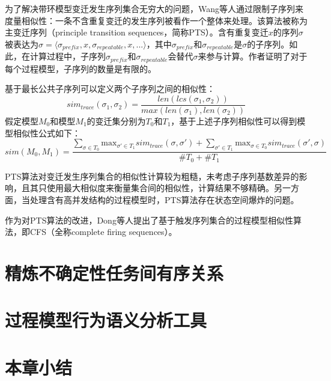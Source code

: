 为了解决带环模型变迁发生序列集合无穷大的问题，Wang等人通过限制子序列来度量相似性：一条不含重复变迁的发生序列被看作一个整体来处理\cite{wang2010behavioral}。该算法被称为主变迁序列（principle transition sequences，简称PTS）。含有重复变迁$x$的序列$\sigma$被表达为$\sigma=\langle\sigma_{prefix},x,\sigma_{repeatable},x,...\rangle$，其中$\sigma_{prefix}$和$\sigma_{repeatable}$是$\sigma$的子序列。如此，在计算过程中，子序列$\sigma_{prefix}$和$\sigma_{repeatable}$会替代$\sigma$来参与计算。作者证明了对于每个过程模型，子序列的数量是有限的。

基于最长公共子序列可以定义两个子序列之间的相似性：
\begin{displaymath}
  sim_{trace}(\sigma_{1},\sigma_{2})=\frac{len(lcs(\sigma_{1},\sigma_{2}))}{max(len(\sigma_{1}),len(\sigma_{2}))}
\end{displaymath}
假定模型$M_{0}$和模型$M_{1}$的变迁集分别为$T_{0}$和$T_{1}$，基于上述子序列相似性可以得到模型相似性公式如下：
\begin{displaymath}
  sim(M_{0},M_{1})=\frac{\sum_{\sigma\in T_{0}}\text{max}_{\sigma'\in T_{1}}sim_{trace}(\sigma,\sigma')+\sum_{\sigma'\in T_{1}}\text{max}_{\sigma\in T_{0}}sim_{trace}(\sigma',\sigma)}{\#T_{0}+\#T_{1}}
\end{displaymath}

PTS算法对变迁发生序列集合的相似性计算较为粗糙，未考虑子序列基数差异的影响，且其只使用最大相似度来衡量集合间的相似性，计算结果不够精确。另一方面，当处理含有高并发结构的过程模型时，PTS算法存在状态空间爆炸的问题。

作为对PTS算法的改进，Dong等人提出了基于触发序列集合的过程模型相似性算法，即CFS（全称complete firing sequences）\cite{dong2014cfs}。

\section{精炼不确定性任务间有序关系}\label{sec:roru}

\section{过程模型行为语义分析工具}\label{sec:related_tools}

\section{本章小结}